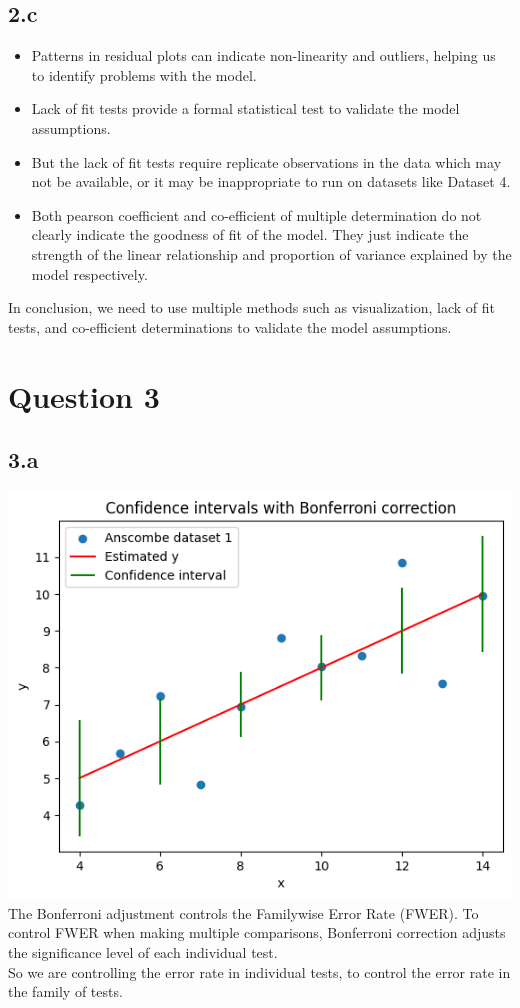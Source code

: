 \documentclass[12pt]{article}
\begin{document}
\subsection*{2.c}
\begin{itemize}
    \item Patterns in residual plots can indicate non-linearity and outliers,
    helping us to identify problems with the model.
    \item Lack of fit tests provide a formal statistical test to validate
    the model assumptions.
    \item But the lack of fit tests require replicate observations in the data
    which may not be available, or it may be inappropriate to run on datasets
    like Dataset 4.
    \item Both pearson coefficient and co-efficient of multiple determination
    do not clearly indicate the goodness of fit of the model. They just indicate
    the strength of the linear relationship and proportion of variance explained
    by the model respectively.
\end{itemize}
In conclusion, we need to use multiple methods such as visualization, lack of fit
tests, and co-efficient determinations to validate the model assumptions.

\newpage
\section*{Question 3}
\subsection*{3.a}
\includegraphics*[width=\linewidth]{graph3a}
The Bonferroni adjustment controls the Familywise Error Rate (FWER).
To control FWER when making multiple comparisons, Bonferroni correction adjusts
the significance level of each individual test.
\\
So we are controlling the error rate in individual tests, to control the
error rate in the family of tests.
\end{document}

